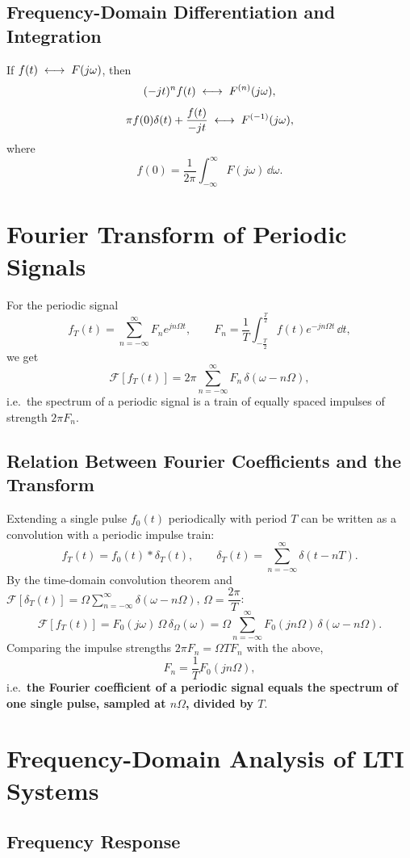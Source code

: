 \subsection{Frequency-Domain Differentiation and Integration}

If $f(t)\;\longleftrightarrow\; F(j\omega)$, then
\[
    (-jt)^{n}f(t)\;\longleftrightarrow\; F^{(n)}(j\omega),
\]
\[
    \pi f(0)\delta(t)+\frac{f(t)}{-jt}\;\longleftrightarrow\; F^{(-1)}(j\omega),
\]
where
\[
    f(0)=\frac{1}{2\pi}\int_{-\infty}^{\infty}F(j\omega)\,\dd\omega .
\]

\section{Fourier Transform of Periodic Signals}

For the periodic signal
\[
    f_T(t)=\sum_{n=-\infty}^{\infty}F_ne^{jn\Omega t},
    \qquad
    F_n=\frac{1}{T}\int_{-\frac{T}{2}}^{\frac{T}{2}}f(t)e^{-jn\Omega t}\,\dd t,
\]
we get
\[
    \mathcal{F}[f_T(t)]=2\pi\sum_{n=-\infty}^{\infty}F_n\,\delta(\omega-n\Omega),
\]
i.e.\ the spectrum of a periodic signal is a train of equally spaced impulses
of strength $2\pi F_n$.

\subsection{Relation Between Fourier Coefficients and the Transform}

Extending a single pulse $f_0(t)$ periodically with period $T$ can be written
as a convolution with a periodic impulse train:
\[
    f_T(t)=f_0(t)*\delta_T(t),
    \qquad
    \delta_T(t)=\sum_{n=-\infty}^{\infty}\delta(t-nT).
\]
By the time-domain convolution theorem and
$\mathcal{F}[\delta_T(t)]=\Omega\displaystyle\sum_{n=-\infty}^{\infty}\delta(\omega-n\Omega)$,
$\Omega=\dfrac{2\pi}{T}$:
\[
    \mathcal{F}[f_T(t)]
    =F_0(j\omega)\,\Omega\,\delta_{\Omega}(\omega)
    =\Omega\sum_{n=-\infty}^{\infty}F_0(jn\Omega)\,\delta(\omega-n\Omega).
\]
Comparing the impulse strengths $2\pi F_n=\Omega T F_n$ with the above,
\[
    F_n=\frac{1}{T}F_0(jn\Omega),
\]
i.e.\ \textbf{the Fourier coefficient of a periodic signal equals the spectrum
of one single pulse, sampled at $n\Omega$, divided by $T$}.

\section{Frequency-Domain Analysis of LTI Systems}

\subsection{Frequency Response}

